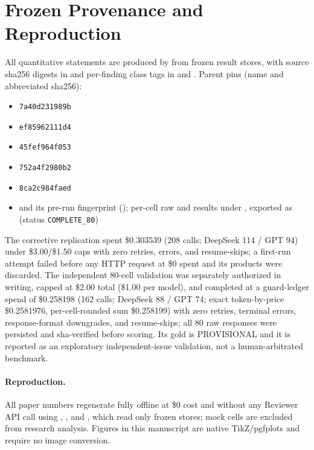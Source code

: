 \section{Frozen Provenance and Reproduction}
\label{app:provenance}

All quantitative statements are produced by 
from frozen result stores, with source sha256 digests in
 and per-finding class tags in
 and .
Parent pins (name and abbreviated sha256):
\begin{itemize}[leftmargin=1.6em,itemsep=1pt,topsep=2pt]
  \item {} \texttt{7a40d231989b}
  \item {} \texttt{ef85962111d4}
  \item {} \texttt{45fef964f053}
  \item {} \texttt{752a4f2980b2}
  \item {} \texttt{8ca2c984faed}
  \item {} and its pre-run fingerprint
  ();
  per-cell raw and results under , exported as
   (status
  \texttt{COMPLETE\_80})
\end{itemize}
The corrective replication spent
\$0.303539 (208 calls; DeepSeek 114 / GPT 94) under \$3.00/\$1.50 caps with
zero retries, errors, and resume-skips; a first-run attempt failed before any
HTTP request at \$0 spent and its products were discarded. The independent
80-cell validation was separately authorized in writing, capped at
\$2.00 total (\$1.00 per model), and completed at a guard-ledger spend of
\$0.258198 (162 calls; DeepSeek 88 / GPT 74; exact token-by-price
\$0.2581976, per-cell-rounded sum \$0.258199) with zero retries, terminal
errors, response-format downgrades, and resume-skips; all 80 raw responses
were persisted and sha-verified before scoring. Its gold is PROVISIONAL and
it is reported as an exploratory independent-issue validation, not a
human-arbitrated benchmark.

\paragraph{Reproduction.}
All paper numbers regenerate fully offline at \$0 cost and without any Reviewer
API call using
,
, and
, which read only frozen stores; mock cells are
excluded from research analysis. Figures in this manuscript are native
TikZ/pgfplots and require no image conversion.

